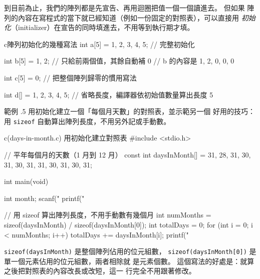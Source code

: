 到目前為止，我們的陣列都是先宣告、再用迴圈把值一個一個讀進去。 但如果
陣列的內容在寫程式的當下就已經知道（例如一份固定的對照表），可以直接用
\emph{初始化}（initializer）在宣告的同時填進去，不用等到執行期才填。

\begin{code}{c}{陣列初始化的幾種寫法}
int a[5] = {1, 2, 3, 4, 5};   // 完整初始化

int b[5] = {1, 2};            // 只給前兩個值，其餘自動補 0
                               // b 的內容是 {1, 2, 0, 0, 0}

int c[5] = {0};                // 把整個陣列歸零的慣用寫法

int d[] = {1, 2, 3, 4, 5};    // 省略長度，編譯器依初始值數量算出長度 5
\end{code}


範例 \thechapter.5 用初始化建立一個「每個月天數」的對照表，並示範另一個
好用的技巧：用 \texttt{sizeof} 自動算出陣列長度，不用另外記或手動數。

\begin{example}{c}{(days-in-month.c) 用初始化建立對照表}
#include <stdio.h>

// 平年每個月的天數（1 月到 12 月）
const int daysInMonth[] = {31, 28, 31, 30, 31, 30, 31, 31, 30, 31, 30, 31};

int main(void) {
    int month;
    scanf("%
    printf("%

    // 用 sizeof 算出陣列長度，不用手動數有幾個月
    int numMonths = sizeof(daysInMonth) / sizeof(daysInMonth[0]);
    int totalDays = 0;
    for (int i = 0; i < numMonths; i++) {
        totalDays += daysInMonth[i];
    }
    printf("%
}
\end{example}


\texttt{sizeof(daysInMonth)} 是整個陣列佔用的位元組數，
\texttt{sizeof(daysInMonth[0])} 是單一個元素佔用的位元組數，兩者相除就
是元素個數。 這個寫法的好處是：就算之後把對照表的內容改長或改短，這一
行完全不用跟著修改。


